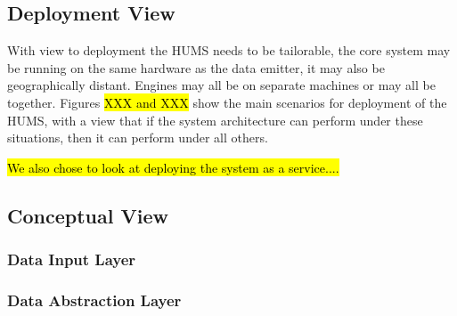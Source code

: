\subsection{Deployment View}
\label{sec:architecture-deploymentview}

With view to deployment the HUMS needs to be tailorable, the core system may be running on the same hardware as the data emitter, it may also be geographically distant. Engines may all be on separate machines or may all be together. Figures \hl{XXX and XXX} show the main scenarios for deployment of the HUMS, with a view that if the system architecture can perform under these situations, then it can perform under all others.

\hl{We also chose to look at deploying the system as a service....}

\subsection{Conceptual View}
\label{sec:architecture-conceptualview}

\subsubsection{Data Input Layer}
\label{sec:architecture-conceptualview-input}

\subsubsection{Data Abstraction Layer}
\label{sec:architecture-conceptulview-abstraction}

